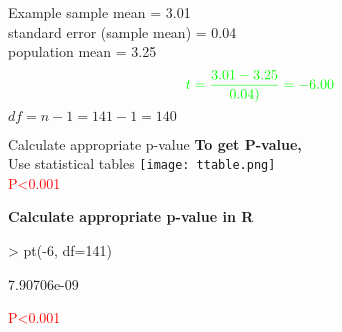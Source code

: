 \documentclass[xcolor=dvipsnames]{beamer}
\begin{document}
\begin{frame}{Example}
sample mean = 3.01 \\
standard error (sample mean) = 0.04 \\
population mean = 3.25 \\

\begin{equation*}
\textcolor{green}{t=\frac{3.01-3.25}{0.04)}=-6.00}
\end{equation*}
\vspace{15mm}
$df=n-1=141-1=140$
\end{frame}

\begin{frame}{Calculate appropriate p-value}
\textbf{To get P-value,} \\
Use statistical tables 
\centering
\texttt{[image: ttable.png]}
\\
\textcolor{red}{P<0.001}
\end{frame}

\begin{frame}[fragile]
\textbf{Calculate appropriate p-value in R}
\begin{Schunk}
\begin{Sinput}
> pt(-6, df=141)
\end{Sinput}
\begin{Soutput}
[1] 7.90706e-09
\end{Soutput}
\end{Schunk}
\textcolor{red}{P<0.001}
\end{frame}
\end{document}
